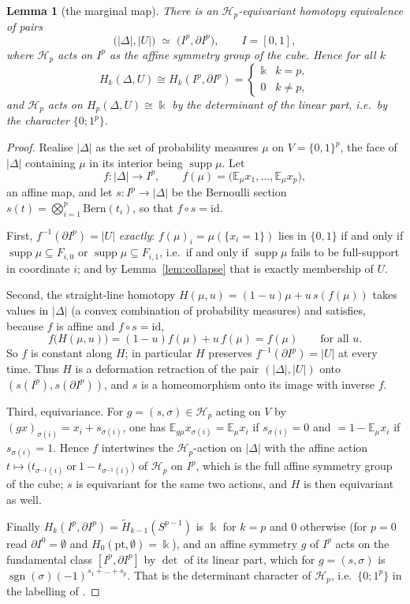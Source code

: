 \documentclass[11pt]{amsart}
\newtheorem{lemma}[theorem]{Lemma}
\theoremstyle{definition}
\theoremstyle{remark}
\DeclareMathOperator{\sgn}{sgn}
\newcommand{\kk}{\Bbbk}
\newcommand{\Hy}{\mathcal H}
\numberwithin{equation}{section}
\begin{document}
\begin{lemma}[the marginal map]\label{lem:pair}
There is an $\Hy_p$-equivariant homotopy equivalence of pairs
\[
  \bigl(|\Delta|,|U|\bigr)\;\simeq\;\bigl(I^p,\partial I^p\bigr),
  \qquad I=[0,1],
\]
where $\Hy_p$ acts on $I^p$ as the affine symmetry group of the cube. Hence for
all $k$
\[
  H_k(\Delta,U)\cong H_k(I^p,\partial I^p)=
  \begin{cases}\kk & k=p,\\ 0 & k\neq p,\end{cases}
\]
and $\Hy_p$ acts on $H_p(\Delta,U)\cong\kk$ by the determinant of the linear
part, i.e.\ by the character $\{0;1^p\}$.
\end{lemma}

\begin{proof}
Realise $|\Delta|$ as the set of probability measures $\mu$ on $V=\{0,1\}^p$,
the face of $|\Delta|$ containing $\mu$ in its interior being
$\operatorname{supp}\mu$. Let
\[
  f:|\Delta|\longrightarrow I^p,\qquad
  f(\mu)=\bigl(\mathbb E_\mu x_1,\dots,\mathbb E_\mu x_p\bigr),
\]
an affine map, and let $s:I^p\to|\Delta|$ be the Bernoulli section
$s(t)=\bigotimes_{i=1}^p\mathrm{Bern}(t_i)$, so that $f\circ s=\mathrm{id}$.

First, $f^{-1}(\partial I^p)=|U|$ \emph{exactly}: $f(\mu)_i=\mu(\{x_i=1\})$
lies in $\{0,1\}$ if and only if $\operatorname{supp}\mu\subseteq F_{i,0}$ or
$\operatorname{supp}\mu\subseteq F_{i,1}$, i.e.\ if and only if
$\operatorname{supp}\mu$ fails to be full-support in coordinate $i$; and by
Lemma~\ref{lem:collapse} that is exactly membership of $U$.

Second, the straight-line homotopy
$H(\mu,u)=(1-u)\mu+u\,s(f(\mu))$ takes values in $|\Delta|$ (a convex
combination of probability measures) and satisfies, because $f$ is affine and
$f\circ s=\mathrm{id}$,
\[
  f\bigl(H(\mu,u)\bigr)=(1-u)f(\mu)+u\,f(\mu)=f(\mu)
  \qquad\text{for all }u .
\]
So $f$ is constant along $H$; in particular $H$ preserves
$f^{-1}(\partial I^p)=|U|$ at every time. Thus $H$ is a deformation retraction
of the pair $(|\Delta|,|U|)$ onto $(s(I^p),s(\partial I^p))$, and $s$ is a
homeomorphism onto its image with inverse $f$.

Third, equivariance. For $g=(s,\sigma)\in\Hy_p$ acting on $V$ by
$(gx)_{\sigma(i)}=x_i+s_{\sigma(i)}$, one has
$\mathbb E_{g\mu}x_{\sigma(i)}=\mathbb E_\mu x_i$ if $s_{\sigma(i)}=0$ and
$=1-\mathbb E_\mu x_i$ if $s_{\sigma(i)}=1$. Hence $f$ intertwines the
$\Hy_p$-action on $|\Delta|$ with the affine action
$t\mapsto\bigl(t_{\sigma^{-1}(i)}\ \text{or}\ 1-t_{\sigma^{-1}(i)}\bigr)$ of
$\Hy_p$ on $I^p$, which is the full affine symmetry group of the cube; $s$ is
equivariant for the same two actions, and $H$ is then equivariant as well.

Finally $H_k(I^p,\partial I^p)=\widetilde H_{k-1}(S^{p-1})$ is $\kk$ for $k=p$
and $0$ otherwise (for $p=0$ read $\partial I^0=\emptyset$ and
$H_0(\mathrm{pt},\emptyset)=\kk$), and an affine symmetry $g$ of $I^p$ acts on
the fundamental class $[I^p,\partial I^p]$ by $\det$ of its linear part, which
for $g=(s,\sigma)$ is $\sgn(\sigma)(-1)^{s_1+\dots+s_p}$. That is the
determinant character of $\Hy_p$, i.e.\ $\{0;1^p\}$ in the labelling of
\cite{GMW}.
\end{proof}
\end{document}
